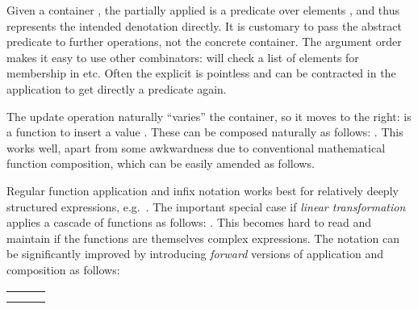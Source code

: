 \begin{isabellebody}
\begin{isamarkuptext}
  Given a container , the partially applied  is a predicate over elements , and
  thus represents the intended denotation directly.  It is customary
  to pass the abstract predicate to further operations, not the
  concrete container.  The argument order makes it easy to use other
  combinators:  will check a list of
  elements for membership in  etc. Often the explicit
   is pointless and can be contracted in the application
   to get directly a predicate again.

  The update operation naturally ``varies'' the container, so it moves
  to the right:  is a function \isa{{\isasymbeta}\ {\isasymrightarrow}\ {\isasymbeta}} to
  insert a value .  These can be composed naturally as
  follows: .  This works well,
  apart from some awkwardness due to conventional mathematical
  function composition, which can be easily amended as follows.%
\end{isamarkuptext}%
\isamarkuptrue%
%
\isamarkuptrue%
%
\begin{isamarkuptext}%
Regular function application and infix notation works best for
  relatively deeply structured expressions, e.g.\ .  The important special case if \emph{linear transformation}
  applies a cascade of functions as follows: .
  This becomes hard to read and maintain if the functions are
  themselves complex expressions.  The notation can be significantly
  improved by introducing \emph{forward} versions of application and
  composition as follows:

  \medskip
  \begin{tabular}{lll}
  \isa{x\ {\isacharbar}{\isachargreater}\ f} & \isa{{\isasymequiv}} & \isa{f\ x} \\
  \isa{f\ {\isacharhash}{\isachargreater}\ g} & \isa{{\isasymequiv}} & \isa{x\ {\isacharbar}{\isachargreater}\ f\ {\isacharbar}{\isachargreater}\ g} \\
  \end{tabular}
  \medskip


\end{isamarkuptext}
\end{isabellebody}

